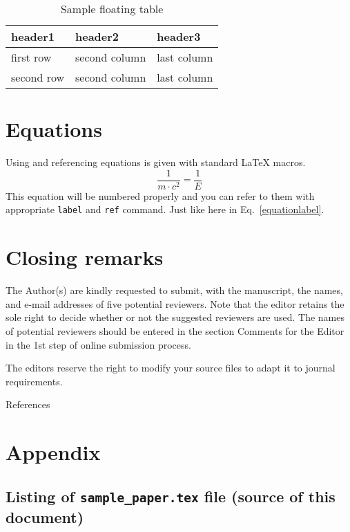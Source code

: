 \documentclass{rgg}
\begin{document}
    \begin{table}[b]
      \caption{Sample floating table}
      \label{labelforgloatingtable}
      \begin{tabular}{@{}lll@{}}
        \toprule
        header1 & header2 & header3 \\
        \midrule
        first row  & second column & last column \\
        second row & second column & last column \\
        \bottomrule
      \end{tabular}
    \end{table}

  \section{Equations}
    Using and referencing equations 
    is given with standard \LaTeX{} macros.
    \begin{equation}
      \frac{1}{m\cdot c^2} = \frac{1}{E}
      \label{equationlabel}
    \end{equation}
    This equation will be numbered properly and you
    can refer to them with appropriate
    \texttt{label} and \texttt{ref} command.
    Just like here in Eq.~\ref{equationlabel}.


  \section{Closing remarks}
    The Author(s) are kindly requested to submit, with the manuscript, 
    the names, and e-mail addresses of five potential reviewers. Note 
    that the editor retains the sole right to decide whether or not the 
    suggested reviewers are used. The names of potential reviewers should 
    be entered in the section Comments for the Editor in the 1st step of 
    online submission process.

    The editors reserve the right to modify 
    your source files to adapt it to journal
    requirements.


    References 

    

\clearpage
  \section*{Appendix}
  \subsection*{Listing of \texttt{sample\_paper.tex} file (source of this document)}
    \scriptsize
    
\end{document}
